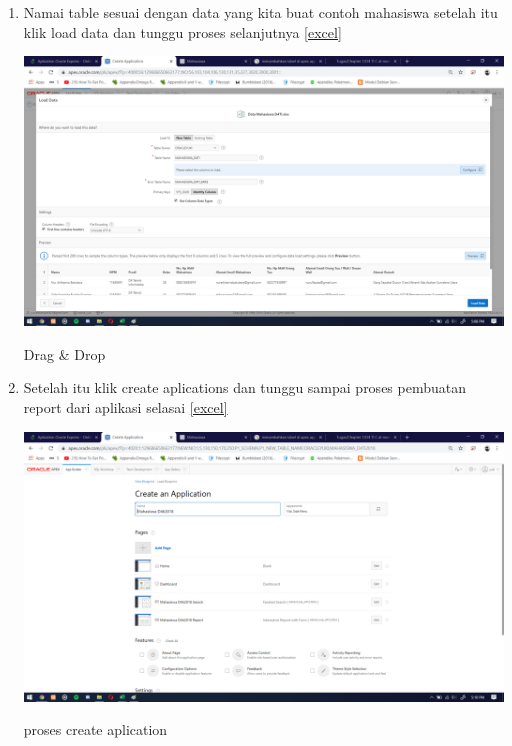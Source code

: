 \documentclass{article}
\begin{document}
\begin{enumerate}
     \item Namai table sesuai dengan data yang kita buat contoh mahasiswa setelah itu klik load data dan tunggu proses selanjutnya
      \ref{excel}
    \begin{center}
         \centering
            \includegraphics[scale=0.27]{figures/DB4.png}
        \caption{Drag & Drop}
        \label{excel}
    \end{center}
    
     \item Setelah itu klik create aplications dan tunggu sampai proses pembuatan report dari aplikasi selasai
      \ref{excel}
    \begin{center}
         \centering
            \includegraphics[scale=0.27]{figures/DB5.png}
        \caption{proses create aplication}
        \label{excel}
    \end{center}
    

\end{enumerate}
\end{document}
